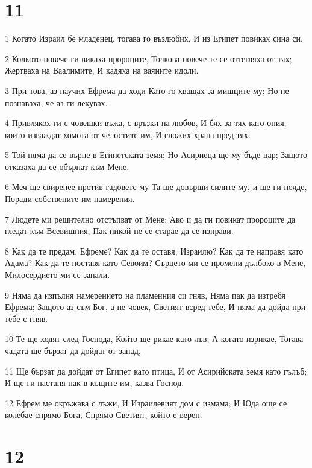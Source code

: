 \chapter{11}

\par 1 Когато Израил бе младенец, тогава го възлюбих, И из Египет повиках сина си.
\par 2 Колкото повече ги викаха пророците, Толкова повече те се оттегляха от тях; Жертваха на Ваалимите, И кадяха на ваяните идоли.
\par 3 При това, аз научих Ефрема да ходи Като го хващах за мишците му; Но не познаваха, че аз ги лекувах.
\par 4 Привлякох ги с човешки въжа, с връзки на любов, И бях за тях като ония, които изваждат хомота от челостите им, И сложих храна пред тях.
\par 5 Той няма да се върне в Египетската земя; Но Асириеца ще му бъде цар; Защото отказаха да се обърнат към Мене.
\par 6 Меч ще свирепее против гадовете му Та ще довърши силите му, и ще ги пояде, Поради собствените им намерения.
\par 7 Людете ми решително отстъпват от Мене; Ако и да ги повикат пророците да гледат  към Всевишния, Пак никой не се старае да се изправи.
\par 8 Как да те предам, Ефреме? Как да те оставя, Израилю? Как да те направя като Адама? Как да те поставя като Севоим? Сърцето ми се промени дълбоко в Мене, Милосердието ми се запали.
\par 9 Няма да изпълня намерението на пламенния си гняв, Няма пак да изтребя Ефрема; Защото аз съм Бог, а не човек, Светият всред тебе, И няма да дойда при тебе с гняв.
\par 10 Те ще ходят след Господа, Който ще рикае като лъв; А когато изрикае, Тогава чадата ще бързат да дойдат от запад,
\par 11 Ще бързат да дойдат от Египет като птица, И от Асирийската земя като гълъб; И ще ги настаня пак  в къщите им, казва Господ.
\par 12 Ефрем ме окръжава с лъжи, И Израилевият дом с измама; И Юда още се колебае спрямо Бога, Спрямо Светият, който е верен.

\chapter{12}

